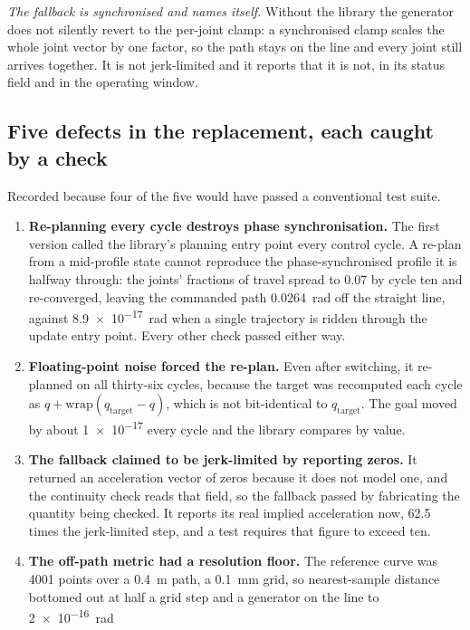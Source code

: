 \emph{The fallback is synchronised and names itself.} Without the library the
generator does not silently revert to the per-joint clamp: a synchronised
clamp scales the whole joint vector by one factor, so the path stays on the
line and every joint still arrives together. It is not jerk-limited and it
reports that it is not, in its status field and in the operating window.

\subsection{Five defects in the replacement, each caught by a check}

Recorded because four of the five would have passed a conventional test suite.

\begin{enumerate}
  \item \textbf{Re-planning every cycle destroys phase synchronisation.} The
    first version called the library's planning entry point every control
    cycle. A re-plan from a mid-profile state cannot reproduce the
    phase-synchronised profile it is halfway through: the joints' fractions of
    travel spread to \num{0.07} by cycle ten and re-converged, leaving the
    commanded path \SI{0.0264}{\radian} off the straight line, against
    \SI{8.9e-17}{\radian} when a single trajectory is ridden through the
    update entry point. Every other check passed either way.
  \item \textbf{Floating-point noise forced the re-plan.} Even after
    switching, it re-planned on all thirty-six cycles, because the target was
    recomputed each cycle as $q + \mathrm{wrap}(q_{\text{target}} - q)$, which
    is not bit-identical to $q_{\text{target}}$. The goal moved by about
    \num{1e-17} every cycle and the library compares by value.
  \item \textbf{The fallback claimed to be jerk-limited by reporting zeros.}
    It returned an acceleration vector of zeros because it does not model one,
    and the continuity check reads that field, so the fallback passed by
    fabricating the quantity being checked. It reports its real implied
    acceleration now, \num{62.5} times the jerk-limited step, and a test
    requires that figure to exceed ten.
  \item \textbf{The off-path metric had a resolution floor.} The reference
    curve was \num{4001} points over a \SI{0.4}{\metre} path, a
    \SI{0.1}{\milli\metre} grid, so nearest-sample distance bottomed out at
    half a grid step and a generator on the line to \SI{2e-16}{\radian}

\end{enumerate}
